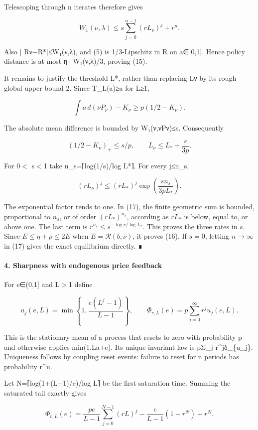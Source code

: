 \documentclass{article}
\begin{document}
Telescoping through n iterates therefore gives

\[
W_1(\nu,\lambda)\le
s\sum_{j=0}^{n-1}(rL_\nu)^j+r^n.
\tag{17}
\]

Also \(\vert\) Rν−R*\(\vert\)≤W₁(ν,λ), and (5) is 1/3-Lipschitz in R on a∈[0,1]. Hence policy distance is at most η+W₁(ν,λ)/3, proving (15).

It remains to justify the threshold L*, rather than replacing Lν by its rough global upper bound 2. Since T\_L(a)≥a for L≥1,

\[
\int a\,d(\nu P_\nu)-K_\nu
\ge p(1/2-K_\nu).
\]

The absolute mean difference is bounded by W₁(ν,νPν)≤s. Consequently

\[
(1/2-K_\nu)_+\le s/p,\qquad
L_\nu\le L_*+\frac{s}{3p}.
\tag{18}
\]

For 0\(\lt\) s\(\lt\)1 take n\_s=⌈log(1/s)/log L*⌉. For every j≤n\_s,

\[
(rL_\nu)^j\le
(rL_*)^j\exp\!\left(\frac{s n_s}{3pL_*}\right).
\]

The exponential factor tends to one. In (17), the finite geometric sum is bounded, proportional to \(n_s\), or of order \((rL_*)^{n_s}\), according as \(rL_*\) is below, equal to, or above one. The last term is \(r^{n_s}\le s^{-\log r/\log L_*}\). This proves the three rates in \(s\). Since \(E\le\eta+\rho\le2E\) when \(E=\mathcal R(b,\nu)\), it proves (16). If \(s=0\), letting \(n\to\infty\) in (17) gives the exact equilibrium directly. ∎

\paragraph{4. Sharpness with endogenous price feedback}

For e∈(0,1] and L\(\gt\)1 define

\[
u_j(e,L)=\min\left\{1,\frac{e(L^j-1)}{L-1}\right\},\qquad
\Phi_{r,L}(e)=p\sum_{j=0}^{\infty}r^j u_j(e,L).
\tag{19}
\]

This is the stationary mean of a process that resets to zero with probability p and otherwise applies min(1,La+e). Its unique invariant law is pΣ\_j r\^{}jδ\_\{u\_j\}. Uniqueness follows by coupling reset events: failure to reset for n periods has probability r\^{}n.

Let N=⌈log(1+(L−1)/e)/log L⌉ be the first saturation time. Summing the saturated tail exactly gives

\[
\Phi_{r,L}(e)=
\frac{pe}{L-1}\sum_{j=0}^{N-1}(rL)^j
-\frac{e}{L-1}(1-r^N)+r^N.
\tag{20}
\]
\end{document}
